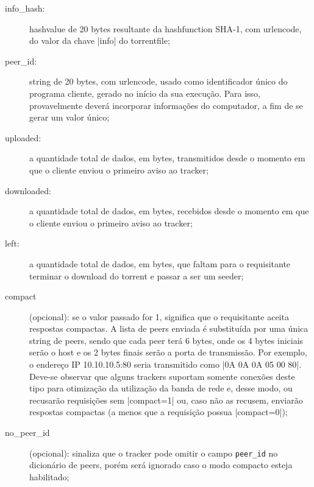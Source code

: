 \begin{description}
    \item[info\_hash:] \gls*{hashvalue} de 20 bytes resultante da \gls*{hashfunction}
        SHA-1, com \gls*{urlencode}, do valor da chave \bverb|info| do
        \gls*{torrentfile};

    \item[peer\_id:] \gls*{string} de 20 bytes, com \gls*{urlencode}, usado como
        identificador único do programa cliente, gerado no início da sua execução. Para
        isso, provavelmente deverá incorporar informações do computador, a fim de se
        gerar um valor único;

    \item[uploaded:] a quantidade total de dados, em bytes, transmitidos desde o
        momento em que o cliente enviou o primeiro aviso ao \gls*{tracker};

    \item[downloaded:] a quantidade total de dados, em bytes, recebidos desde o momento
        em que o cliente enviou o primeiro aviso ao \gls*{tracker};

    \item[left:] a quantidade total de dados, em bytes, que faltam para o requisitante
        terminar o download do \gls*{torrent} e passar a ser um \gls*{seeder};

    \item[compact] (opcional): \label{par:compact} se o valor passado for 1, significa
        que o requisitante aceita respostas compactas. A lista de \glspl*{peer} enviada
        é substituída por uma única \gls*{string} de \glspl*{peer}, sendo que cada
        \gls*{peer} terá 6 bytes, onde os 4 bytes iniciais serão o host e os 2 bytes
        finais serão a porta de transmissão. Por exemplo, o endereço IP 10.10.10.5:80
        seria transmitido como \bverb|0A 0A 0A 05 00 80|. Deve-se observar que alguns
        \glspl*{tracker} suportam somente conexões deste tipo para otimização da
        utilização da banda de rede e, desse modo, ou recusarão requisições sem
        \bverb|compact=1| ou, caso não as recusem, enviarão respostas compactas (a
        menos que a requisição possua \bverb|compact=0|);

    \item[no\_peer\_id] (opcional): sinaliza que o \gls*{tracker} pode omitir o
        campo \textcolor{Bittersweet}{\texttt{peer\_id}} no dicionário de \glspl*{peer},
        porém será ignorado caso o modo compacto esteja habilitado;


\end{description}
